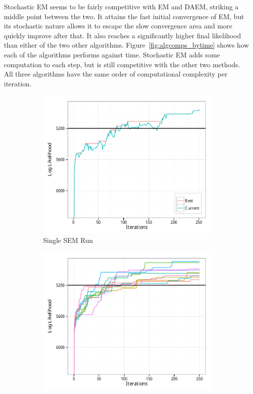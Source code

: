 \documentclass{article}
\theoremstyle{definition}
\theoremstyle{algodesc}
\begin{document}
Stochastic EM seems to be fairly competitive with EM and DAEM, striking a middle point between the two. It attains the fast initial convergence of EM, but its stochastic nature allows it to escape the slow convergence area and more quickly improve after that. It also reaches a significantly higher final likelihood than either of the two other algorithms. Figure~\ref{fig:algcomps_bytime} shows how each of the algorithms performs against time. Stochastic EM adds some computation to each step, but is still competitive with the other two methods. All three algorithms have the same order of computational complexity per iteration.

\begin{figure}[htb] \centering
  \begin{subfigure}[t]{.45\linewidth}
    \includegraphics[width=\linewidth]{include/sa_singlerun.pdf}
    \caption{Single SEM Run} \label{fig:sa_singlerun}
  \end{subfigure}
  \begin{subfigure}[t]{.45\linewidth}
    \includegraphics[width=\linewidth]{include/sa992.pdf}

\end{subfigure}
\end{figure}
\end{document}
